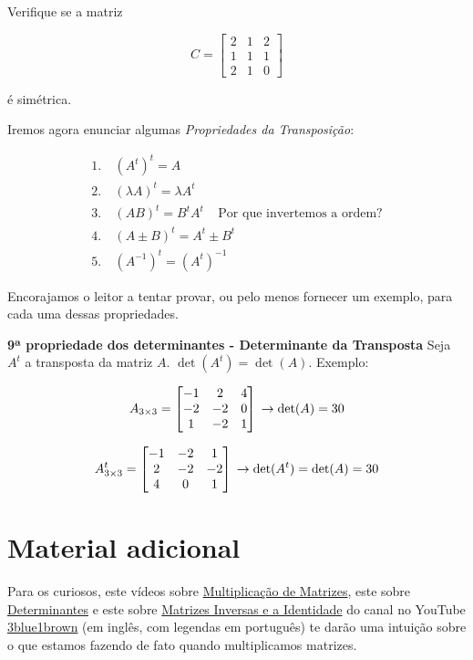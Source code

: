 \documentclass[
  portuguese,
  letterpaper,
  DIV=11,
  numbers=noendperiod]{scrreport}
\begin{document}
Verifique se a matriz

\[
C = \begin{bmatrix}
    2 & 1 & 2\\
    1 & 1 & 1\\
    2 & 1 & 0 
\end{bmatrix}
\]

é simétrica.

Iremos agora enunciar algumas \emph{Propriedades da Transposição}:

\[
\begin{aligned}
1.&~ (A^{t})^{t} = A \\
2.&~ (\lambda A)^{t} = \lambda A^{t} \\
3.&~ (AB)^{t} = B^t A^t ~~~~~ \text{Por que invertemos a ordem?} \\
4.&~ (A \pm B)^{t} = A^t \pm B^t \\
5.&~ (A^{-1})^{t} = (A^{t})^{-1}
\end{aligned}
\]

Encorajamos o leitor a tentar provar, ou pelo menos fornecer um exemplo,
para cada uma dessas propriedades.

\textbf{9ª propriedade dos determinantes - Determinante da Transposta}
Seja \(A^t\) a transposta da matriz \(A\). \(\det(A^t) = \det(A)\).
Exemplo:

\[
A_{3\times3} =
\begin{bmatrix}
    -1 & 2 & 4  \\
    -2 & -2 & 0 \\
    1 & -2 & 1 \\
\end{bmatrix}  \\
\rightarrow \det(A) = 30
\]

\[
A^t_{3\times3} =
\begin{bmatrix}
    -1 & -2 & 1 \\
    2 & -2 & -2 \\
    4 & 0 & 1 \\
\end{bmatrix}  \\
\rightarrow \det(A^t) = \det(A) = 30
\]

\section{Material adicional}\label{sec-material-matrizes}

Para os curiosos, este vídeos sobre
\href{https://youtu.be/XkY2DOUCWMU}{Multiplicação de Matrizes}, este
sobre \href{https://www.youtube.com/watch?v=Ip3X9LOh2dk}{Determinantes}
e este sobre \href{https://youtu.be/uQhTuRlWMxw}{Matrizes Inversas e a
Identidade} do canal no YouTube
\href{https://www.youtube.com/@3blue1brown}{3blue1brown} (em inglês, com
legendas em português) te darão uma intuição sobre o que estamos fazendo
de fato quando multiplicamos matrizes.
\end{document}
